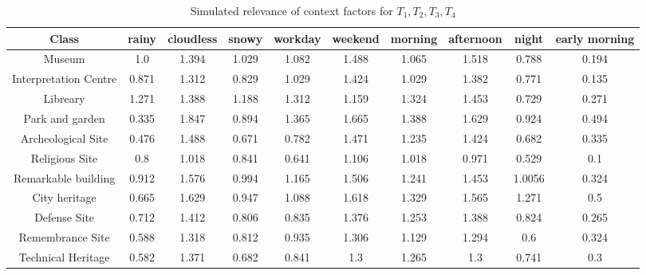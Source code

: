 \begin{table}[h!]
\centering
\caption{Simulated relevance of context factors for $T_1, T_2, T_3, T_4$
}
\label{table:relevances-experiment}
\begin{tabular}{ |c|c|c|c|c|c|c|c|c|c| } 
    \hline
    \textbf{Class} & \textbf{rainy} & \textbf{cloudless} & \textbf{snowy} & \textbf{workday} & \textbf{weekend} & \textbf{morning} & \textbf{afternoon} & \textbf{night} & \textbf{early morning} \\
    \hline
    \hline

    Museum & 1.0 & 1.394 & 1.029 & 1.082 & 1.488 & 1.065 & 1.518 & 0.788 & 0.194 \\ \hline
    
    Interpretation Centre & 0.871 & 1.312 & 0.829 & 1.029 & 1.424 & 1.029  & 1.382 & 0.771 & 0.135 \\ \hline

    Libreary & 1.271 & 1.388  & 1.188  & 1.312 &1.159 & 1.324 & 1.453 & 0.729  & 0.271 \\ \hline

    Park and garden &
    0.335 & 1.847  & 0.894 & 1.365 & 1.665 & 1.388  & 1.629 & 0.924 & 0.494  \\ \hline

    Archeological Site &
    0.476 & 1.488 & 0.671 & 0.782 & 1.471 & 1.235 & 1.424 & 0.682  & 0.335 \\ \hline

    Religious Site &
    0.8 & 1.018 & 0.841  & 0.641  & 1.106 & 1.018 & 0.971 & 0.529  & 0.1 \\ \hline

    Remarkable building &
    0.912 & 1.576  & 0.994  & 1.165 & 1.506 & 1.241  & 1.453 & 1.0056 & 0.324 \\ \hline
    
    City heritage &
    0.665 & 1.629  & 0.947  & 1.088  & 1.618 & 1.329  & 1.565 & 1.271 & 0.5 \\ \hline
    
    Defense Site &
    0.712 & 1.412 & 0.806 & 0.835  & 1.376  & 1.253 & 1.388  & 0.824 & 0.265 \\ \hline
    
    Remembrance Site &
    0.588  & 1.318 & 0.812 & 0.935  & 1.306 & 1.129  & 1.294  & 0.6 & 0.324 \\ \hline
    
    Technical Heritage &
    0.582  & 1.371 & 0.682  & 0.841  & 1.3 & 1.265 & 1.3 & 0.741  & 0.3 \\ \hline
    

\end{tabular}
\end{table}
